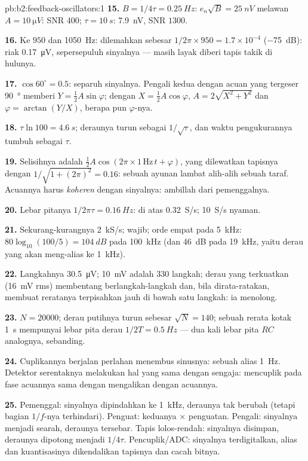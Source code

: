 \begin{solution}{pb:b2:feedback-oscillators:1}
\textbf{15.} $B = 1/4\tau = \qty{0.25}{Hz}$: $e_n\sqrt B = \qty{25}{nV}$ melawan $A =
\qty{10}{\micro V}$: SNR $400$; $\tau = \qty{10}{s}$: \qty{7.9}{nV}, SNR $1300$.

\textbf{16.} Ke $950$ dan \qty{1050}{Hz}: dilemahkan sebesar $1/2\pi \times 950 = 1.7 \times
10^{-4}$ (\qty{-75}{dB}): riak \qty{0.17}{\micro V}, sepersepuluh sinyalnya ---
masih layak diberi tapis takik di hulunya.

\textbf{17.} $\cos60^\circ = 0.5$: separuh sinyalnya. Pengali kedua dengan
acuan yang tergeser \qty{90}{\degree} memberi $Y = \tfrac12A\sin\varphi$; dengan $X =
\tfrac12A\cos\varphi$, $A = 2\sqrt{X^2 + Y^2}$ dan $\varphi = \arctan(Y/X)$, berapa pun $\varphi$-nya.

\textbf{18.} $\tau\ln100 = \qty{4.6}{s}$; deraunya turun sebagai $1/\sqrt\tau$, dan waktu
pengukurannya tumbuh sebagai $\tau$.

\textbf{19.} Selisihnya adalah $\tfrac12A\cos(2\pi \times 1\,\text{Hz}\,t + \varphi)$,
yang dilewatkan tapisnya dengan $1/\sqrt{1 + (2\pi)^2} = 0.16$: sebuah ayunan
lambat alih-alih sebuah taraf. Acuannya harus \emph{koheren}
dengan sinyalnya: ambillah dari pemenggalnya.

\textbf{20.} Lebar pitanya $1/2\pi\tau = \qty{0.16}{Hz}$: di atas \qty{0.32}{S/s};
\qty{10}{S/s} nyaman.

\textbf{21.} Sekurang-kurangnya \qty{2}{kS/s};  wajib;
orde empat pada \qty{5}{kHz}: $80\log_{10}(100/5) = \qty{104}{dB}$ pada \qty{100}{kHz}
(dan \qty{46}{dB} pada \qty{19}{kHz}, yaitu derau yang akan meng-alias ke \qty{1}{kHz}).

\textbf{22.} Langkahnya \qty{30.5}{\micro V}; \qty{10}{mV} adalah $330$ langkah; derau
yang terkuatkan (\qty{16}{mV} rms) membentang berlangkah-langkah dan, bila dirata-ratakan, membuat reratanya
terpisahkan jauh di bawah satu langkah: ia menolong.

\textbf{23.} $N = 20000$; derau putihnya turun sebesar $\sqrt N = 140$; sebuah
rerata kotak \qty{1}{s} mempunyai lebar pita derau $1/2T = \qty{0.5}{Hz}$ --- dua kali
lebar pita $RC$ analognya, sebanding.

\textbf{24.} Cuplikannya berjalan perlahan menembus sinusnya: sebuah alias \qty{1}{Hz}.
Detektor serentaknya melakukan hal yang sama dengan sengaja: mencuplik pada fase
acuannya sama dengan mengalikan dengan acuannya.

\textbf{25.} Pemenggal: sinyalnya dipindahkan ke \qty{1}{kHz}, deraunya tak berubah (tetapi
bagian $1/f$-nya terhindari). Penguat: keduanya $\times$ penguatan. Pengali: sinyalnya
menjadi searah, deraunya tersebar. Tapis lolos-rendah: sinyalnya disimpan, deraunya dipotong menjadi $1/4\tau$.
Pencuplik/ADC: sinyalnya terdigitalkan, alias dan kuantisasinya dikendalikan
tapisnya dan cacah bitnya.
\end{solution}
